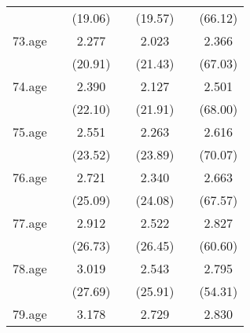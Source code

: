 {\begin{tabular}{l*{6}{c}}
            &                     &     (19.06)         &                     &     (19.57)         &                     &     (66.12)         \\
[1em]
73.age      &                     &       2.277\sym{***}&                     &       2.023\sym{***}&                     &       2.366\sym{***}\\
            &                     &     (20.91)         &                     &     (21.43)         &                     &     (67.03)         \\
[1em]
74.age      &                     &       2.390\sym{***}&                     &       2.127\sym{***}&                     &       2.501\sym{***}\\
            &                     &     (22.10)         &                     &     (21.91)         &                     &     (68.00)         \\
[1em]
75.age      &                     &       2.551\sym{***}&                     &       2.263\sym{***}&                     &       2.616\sym{***}\\
            &                     &     (23.52)         &                     &     (23.89)         &                     &     (70.07)         \\
[1em]
76.age      &                     &       2.721\sym{***}&                     &       2.340\sym{***}&                     &       2.663\sym{***}\\
            &                     &     (25.09)         &                     &     (24.08)         &                     &     (67.57)         \\
[1em]
77.age      &                     &       2.912\sym{***}&                     &       2.522\sym{***}&                     &       2.827\sym{***}\\
            &                     &     (26.73)         &                     &     (26.45)         &                     &     (60.60)         \\
[1em]
78.age      &                     &       3.019\sym{***}&                     &       2.543\sym{***}&                     &       2.795\sym{***}\\
            &                     &     (27.69)         &                     &     (25.91)         &                     &     (54.31)         \\
[1em]
79.age      &                     &       3.178\sym{***}&                     &       2.729\sym{***}&                     &       2.830\sym{***}\\

\end{tabular}}
